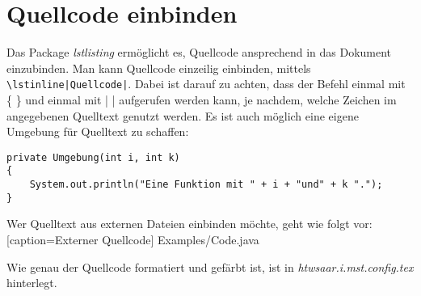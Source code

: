 
\chapter{Quellcode einbinden}
Das Package \textit{lstlisting} ermöglicht es, Quellcode ansprechend in das Dokument einzubinden. Man kann Quellcode einzeilig einbinden, mittels \lstinline{\lstinline|Quellcode|}. Dabei ist darauf zu achten, dass der Befehl einmal mit \{ \} und einmal mit | | aufgerufen werden kann, je nachdem, welche Zeichen im angegebenen Quelltext genutzt werden. 
Es ist auch möglich eine eigene Umgebung für Quelltext zu schaffen:\\

\begin{lstlisting}[caption=Erstes Listing]
private Umgebung(int i, int k)
{
	System.out.println("Eine Funktion mit " + i + "und" + k ".");
}
\end{lstlisting}  

Wer Quelltext aus externen Dateien einbinden möchte, geht wie folgt vor:\\


[caption={Externer Quellcode}]
{Examples/Code.java}

Wie genau der Quellcode formatiert und gefärbt ist, ist in \textit{htwsaar.i.mst.config.tex} hinterlegt.